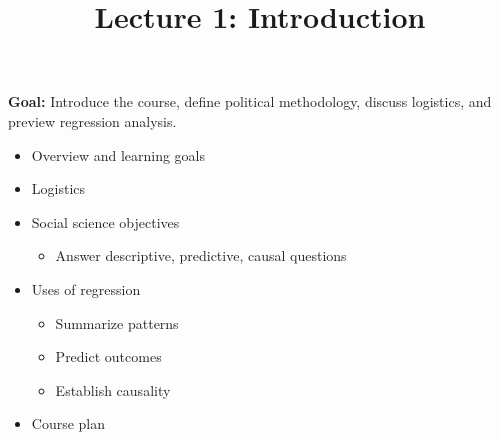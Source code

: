 \documentclass[12pt]{article}
\title{\Large Lecture 1: Introduction}
\author{}
\date{}
\begin{document}
\maketitle
\vspace{-6em}

\noindent \textbf{Goal:} Introduce the course, define political methodology, discuss logistics, and preview regression analysis.\medskip

\begin{itemize}\setlength{\itemsep}{1em}
\item Overview and learning goals
\item Logistics
\item Social science objectives
\begin{itemize}
\item Answer descriptive, predictive, causal questions
\end{itemize}
\item Uses of regression
\begin{itemize}
\item Summarize patterns
\item Predict outcomes
\item Establish causality
\end{itemize}
\item Course plan
\end{itemize}


\end{document}
